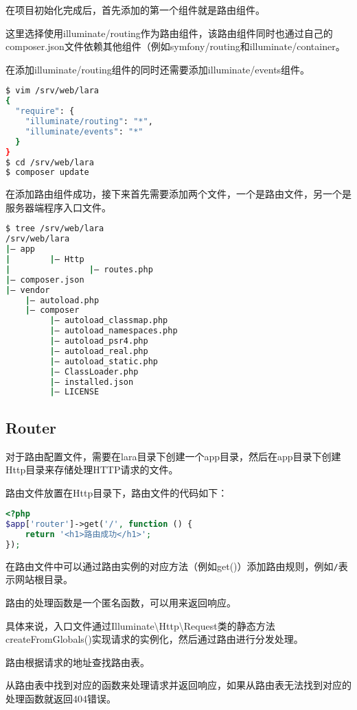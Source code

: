 在项目初始化完成后，首先添加的第一个组件就是路由组件。

这里选择使用illuminate/routing作为路由组件，该路由组件同时也通过自己的composer.json文件依赖其他组件（例如symfony/routing和illuminate/container。

在添加illuminate/routing组件的同时还需要添加illuminate/events组件。


\begin{lstlisting}[language=bash]
$ vim /srv/web/lara
{
  "require": {
    "illuminate/routing": "*",
    "illuminate/events": "*"
  }
}
$ cd /srv/web/lara
$ composer update
\end{lstlisting}



在添加路由组件成功，接下来首先需要添加两个文件，一个是路由文件，另一个是服务器端程序入口文件。

\begin{lstlisting}[language=bash]
$ tree /srv/web/lara
/srv/web/lara
|— app
|        |— Http
|                |— routes.php
|— composer.json
|— vendor
    |— autoload.php
    |— composer
         |— autoload_classmap.php
         |— autoload_namespaces.php
         |— autoload_psr4.php
         |— autoload_real.php
         |— autoload_static.php
         |— ClassLoader.php
         |— installed.json
         |— LICENSE
\end{lstlisting}

\subsection{Router}


对于路由配置文件，需要在lara目录下创建一个app目录，然后在app目录下创建Http目录来存储处理HTTP请求的文件。

路由文件放置在Http目录下，路由文件的代码如下：

\begin{lstlisting}[language=PHP]
<?php
$app['router']->get('/', function () {
    return '<h1>路由成功</h1>';
});
\end{lstlisting}

在路由文件中可以通过路由实例的对应方法（例如get()）添加路由规则，例如\texttt{/}表示网站根目录。

路由的处理函数是一个匿名函数，可以用来返回响应。

具体来说，入口文件通过Illuminate\textbackslash Http\textbackslash Request类的静态方法createFromGlobals()实现请求的实例化，然后通过路由进行分发处理。

\begin{compactenum}
\item 路由根据请求的地址查找路由表。
\item 从路由表中找到对应的函数来处理请求并返回响应，如果从路由表无法找到对应的处理函数就返回404错误。
\end{compactenum}

